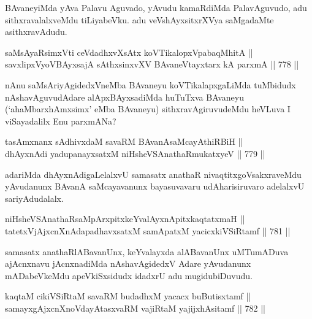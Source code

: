 \begin{artha} 
BAvaneyiMda yAva Palavu Aguvado, yAvudu kamaRdiMda PalavAguvudo, adu sithxravalalxveMdu tiLiyabeVku. adu veVshAyxsitxrXVya saMgadaMte asithxravAdudu.
\end{artha}

\begin{shl}
saMsAyaRsimxVti ceVdadhxvXsAtx koVTikalopxVpabaqMhitA || \\
savxlipxVyoVBAyxsajA sAthxsinxvXV BAvaneVtayxtarx kA parxmA \hfill || 778 ||  
\end{shl}

\begin{artha} 
nAnu saMsAriyAgidedxVneMba BAvaneyu koVTikalapxgaLiMda tuMbidudx 
nAshavAguvudAdare alApxBAyxsadiMda huTuTxva BAvaneyu 
(`ahaMbarxhAmxsimx' eMba BAvaneyu) sithxravAgiruvudeMdu heVLuva I 
viSayadalilx Enu parxmANa?
\end{artha}

\begin{shl}
tasAmxnanx sAdhivxdaM savaRM BAvanAsaMcayAthiRBiH || \\
dhAyxnAdi yadupanayxsatxM niHsheVSAnathaRmukatxyeV \hfill || 779 ||  
\end{shl}

\begin{artha} 
adariMda dhAyxnAdigaLelalxvU samasatx anathaR nivaqtitxgoVsakxraveMdu yAvudanunx BAvanA saMcayavanunx bayasuvavaru udAharisiruvaro adelalxvU sariyAdudalalx.
\end{artha}

\begin{shl}
niHsheVSAnathaRsaMpArxpitxkeYvalAyxnApitxkaqtatxmaH || \\
tatetxVjAjxcnXnAdapadhavxsatxM samApatxM yacicxkiVSiRtamf \hfill || 781 ||  
\end{shl}

\begin{artha} 
samasatx anathaRlABavanUnx, keYvalayxda alABavanUnx uMTumADuva ajAcnxnavu jAcnxnadiMda nAshavAgidedxV Adare yAvudanunx mADabeVkeMdu apeVkiSxsidudx idadxrU adu mugidubiDuvudu.
\end{artha}


\begin{shl}
kaqtaM cikiVSiRtaM savaRM budadhxM yacacx buButisxtamf || \\
samayxgAjxcnXnoVdayAtasxvaRM vajiRtaM yajijxhAsitamf \hfill || 782 ||  
\end{shl}

